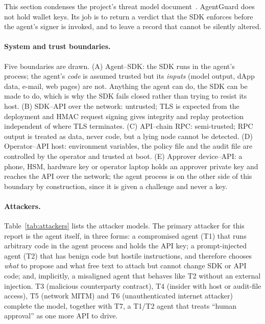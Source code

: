 \documentclass[10pt]{article}
\begin{document}
This section condenses the project's threat model document~\cite{threatmodel}. AgentGuard does not hold wallet keys. Its job is to return a verdict that the SDK enforces before the agent's signer is invoked, and to leave a record that cannot be silently altered.

\paragraph{System and trust boundaries.} Five boundaries are drawn. (A) Agent--SDK: the SDK runs in the agent's process; the agent's \emph{code} is assumed trusted but its \emph{inputs} (model output, dApp data, e-mail, web pages) are not. Anything the agent can do, the SDK can be made to do, which is why the SDK fails closed rather than trying to resist its host. (B) SDK--API over the network: untrusted; TLS is expected from the deployment and HMAC request signing gives integrity and replay protection independent of where TLS terminates. (C) API--chain RPC: semi-trusted; RPC output is treated as data, never code, but a lying node cannot be detected. (D) Operator--API host: environment variables, the policy file and the audit file are controlled by the operator and trusted at boot. (E) Approver device--API: a phone, HSM, hardware key or operator laptop holds an approver private key and reaches the API over the network; the agent process is on the other side of this boundary by construction, since it is given a challenge and never a key.

\paragraph{Attackers.} Table~\ref{tab:attackers} lists the attacker models. The primary attacker for this report is the agent itself, in three forms: a compromised agent (T1) that runs arbitrary code in the agent process and holds the API key; a prompt-injected agent (T2) that has benign code but hostile instructions, and therefore chooses \emph{what} to propose and what free text to attach but cannot change SDK or API code; and, implicitly, a misaligned agent that behaves like T2 without an external injection. T3 (malicious counterparty contract), T4 (insider with host or audit-file access), T5 (network MITM) and T6 (unauthenticated internet attacker) complete the model, together with T7, a T1/T2 agent that treats ``human approval'' as one more API to drive.
\end{document}
